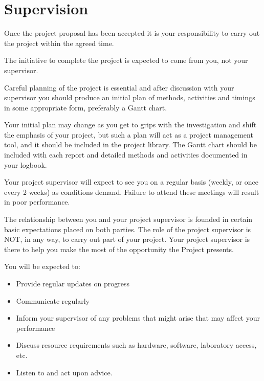 \chapter{Supervision}

Once the project proposal has been accepted it is your responsibility to carry out the project within the agreed time.

\begin{tcolorbox}
    The initiative to complete the project is expected to come from you, not your supervisor.
\end{tcolorbox}

Careful planning of the project is essential and after discussion with your supervisor you should produce an initial plan of methods, activities and timings in some appropriate form, preferably a Gantt chart.

Your initial plan may change as you get to grips with the investigation and shift the emphasis of your project, but such a plan will act as a project management tool, and it should be included in the project library. The Gantt chart should be included with each report and detailed methods and activities documented in your logbook.

\begin{tcolorbox}
    Your project supervisor will expect to see you on a regular basis (weekly, or once every 2 weeks) as conditions demand. Failure to attend these meetings will result in poor performance.
\end{tcolorbox}

The relationship between you and your project supervisor is founded in certain basic expectations placed on both parties. The role of the project supervisor is NOT, in any way, to carry out part of your project. Your project supervisor is there to help you make the most of the opportunity the Project presents.

You will be expected to:

\begin{itemize}
    \item Provide regular updates on progress
    \item Communicate regularly
    \item Inform your supervisor of any problems that might arise that may affect your performance
    \item Discuss resource requirements such as hardware, software, laboratory access, etc.
    \item Listen to and act upon advice.
\end{itemize}

